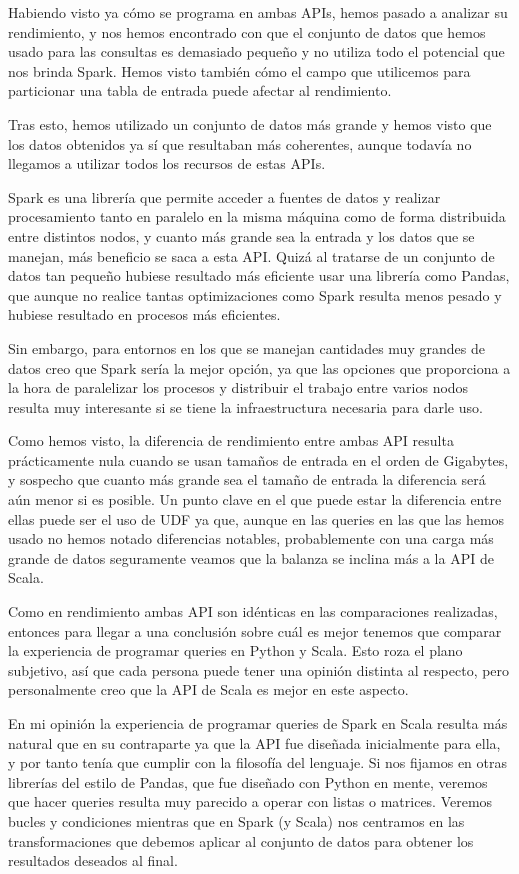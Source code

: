 \documentclass[12pt,twoside,titlepage]{report}
\begin{document}
Habiendo visto ya cómo se programa en ambas APIs, hemos pasado a analizar su rendimiento, y nos hemos encontrado con que el conjunto de datos que hemos usado para las consultas es demasiado pequeño y no utiliza todo el potencial que nos brinda Spark. Hemos visto también cómo el campo que utilicemos para particionar una tabla de entrada puede afectar al rendimiento.

Tras esto, hemos utilizado un conjunto de datos más grande y hemos visto que los datos obtenidos ya sí que resultaban más coherentes, aunque todavía no llegamos a utilizar todos los recursos de estas APIs.

Spark es una librería que permite acceder a fuentes de datos y realizar procesamiento tanto en paralelo en la misma máquina como de forma distribuida entre distintos nodos, y cuanto más grande sea la entrada y los datos que se manejan, más beneficio se saca a esta API. Quizá al tratarse de un conjunto de datos tan pequeño hubiese resultado más eficiente usar una librería como Pandas, que aunque no realice tantas optimizaciones como Spark resulta menos pesado y hubiese resultado en procesos más eficientes.

Sin embargo, para entornos en los que se manejan cantidades muy grandes de datos creo que Spark sería la mejor opción, ya que las opciones que proporciona a la hora de paralelizar los procesos y distribuir el trabajo entre varios nodos resulta muy interesante si se tiene la infraestructura necesaria para darle uso.

Como hemos visto, la diferencia de rendimiento entre ambas API resulta prácticamente nula cuando se usan tamaños de entrada en el orden de Gigabytes, y sospecho que cuanto más grande sea el tamaño de entrada la diferencia será aún menor si es posible. Un punto clave en el que puede estar la diferencia entre ellas puede ser el uso de UDF ya que, aunque en las queries en las que las hemos usado no hemos notado diferencias notables, probablemente con una carga más grande de datos seguramente veamos que la balanza se inclina más a la API de Scala.

Como en rendimiento ambas API son idénticas en las comparaciones realizadas, entonces para llegar a una conclusión sobre cuál es mejor tenemos que comparar la experiencia de programar queries en Python y Scala. Esto roza el plano subjetivo, así que cada persona puede tener una opinión distinta al respecto, pero personalmente creo que la API de Scala es mejor en este aspecto.

En mi opinión la experiencia de programar queries de Spark en Scala resulta más natural que en su contraparte ya que la API fue diseñada inicialmente para ella, y por tanto tenía que cumplir con la filosofía del lenguaje. Si nos fijamos en otras librerías del estilo de Pandas, que fue diseñado con Python en mente, veremos que hacer queries resulta muy parecido a operar con listas o matrices. Veremos bucles y condiciones mientras que en Spark (y Scala) nos centramos en las transformaciones que debemos aplicar al conjunto de datos para obtener los resultados deseados al final.
\end{document}

